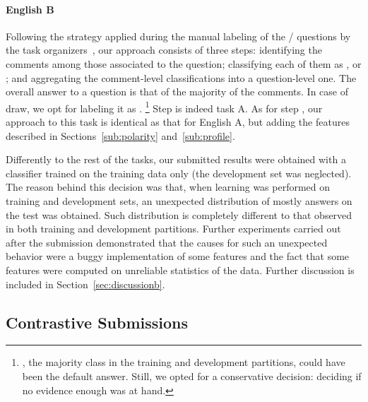 \paragraph{English B}

Following the strategy applied during the manual labeling of the \yes/\no 
questions by the task organizers~\cite{Marquez-EtAl:2015:SemEval}, our approach 
consists of three steps:
\Ni identifying the \good comments among those associated to the question;
\Nii classifying each of them as \yes, \no or \unsure; and 
\Niii aggregating the comment-level classifications into a question-level one. 
The overall answer to a question is that of the majority of the comments. In 
case of draw, we opt for labeling it as \unsure.%
\footnote{\yes, the majority class in the training and development partitions, 
could have been the default answer. Still, we opted for a conservative decision: 
deciding \unsure if no evidence enough was at hand.}
Step \Ni is indeed task A. As for step \Nii, our approach to this task is 
identical as that for English A, but adding the features described in 
Sections~\ref{sub:polarity} and~\ref{sub:profile}.

Differently to the rest of the tasks, our submitted results were obtained with a 
classifier trained on the training data only (the development set was 
neglected). The reason behind this decision was that, when learning was performed on training and development sets,
an unexpected distribution of mostly \yes answers on the test was obtained. 
Such distribution is completely different to that observed in both training and development partitions. 
Further experiments carried out after the submission demonstrated that the causes for such an 
unexpected behavior were a buggy implementation of some features and the fact that 
some features were computed on unreliable statistics of the data. 
Further discussion is included in Section~\ref{sec:discussionb}.


\subsection{Contrastive Submissions}
\label{sub:contrastive}

